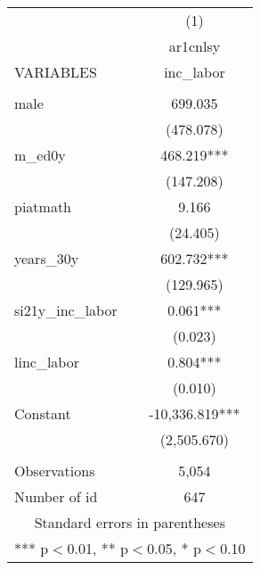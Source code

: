 \begin{tabular}{lc} \hline
 & (1) \\
 & ar1cnlsy \\
VARIABLES & inc\_labor \\ \hline
 &  \\
male & 699.035 \\
 & (478.078) \\
m\_ed0y & 468.219*** \\
 & (147.208) \\
piatmath & 9.166 \\
 & (24.405) \\
years\_30y & 602.732*** \\
 & (129.965) \\
si21y\_inc\_labor & 0.061*** \\
 & (0.023) \\
linc\_labor & 0.804*** \\
 & (0.010) \\
Constant & -10,336.819*** \\
 & (2,505.670) \\
 &  \\
Observations & 5,054 \\
 Number of id & 647 \\ \hline
\multicolumn{2}{c}{ Standard errors in parentheses} \\
\multicolumn{2}{c}{ *** p$<$0.01, ** p$<$0.05, * p$<$0.10} \\
\end{tabular}
